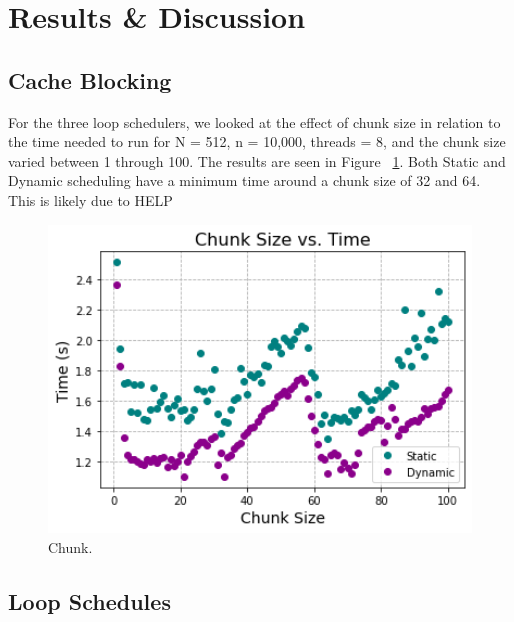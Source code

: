\documentclass{article}
\begin{document}
\section{Results \& Discussion}

\subsection{Cache Blocking}

For the three loop schedulers, we looked at the effect of chunk size in relation to the time needed to run for N = 512, n = 10,000, threads = 8, and the chunk size varied between 1 through 100. The results are seen in Figure ~\ref{Chunk_Size}. Both Static and Dynamic scheduling have a minimum time around a chunk size of 32 and 64. This is likely due to HELP 

\begin{figure}[h]
\centering
\includegraphics[width=1.0\textwidth]{Images/Chunk Size vs Time.png}
\caption{Chunk.}
\label{Chunk_Size}
\end{figure}

\subsection{Loop Schedules}
\end{document}
